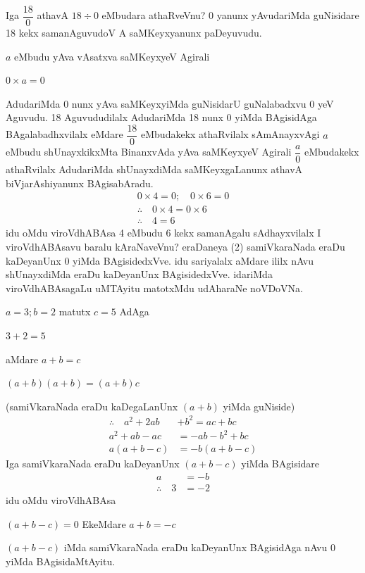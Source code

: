 Iga $\dfrac{18}{0}$ athavA $18\div 0$ eMbudara athaRveVnu? {\rm 0} yanunx yAvudariMda guNisidare {\rm 18} kekx samanAguvudoV A saMKeyxyanunx paDeyuvudu.

 $a$ eMbudu yAva vAsatxva saMKeyxyeV Agirali
\begin{center}
$0\times a=0$
\end{center}
AdudariMda {\rm 0} nunx yAva saMKeyxyiMda guNisidarU guNalabadxvu {\rm 0} yeV Aguvudu. {\rm 18} Aguvududilalx AdudariMda {\rm 18} nunx {\rm 0} yiMda BAgisidAga BAgalabadhxvilalx eMdare $\dfrac{18}{0}$ eMbudakekx athaRvilalx sAmAnayxvAgi $a$ eMbudu shUnayxkikxMta BinanxvAda yAva saMKeyxyeV Agirali $\dfrac{a}{0}$ eMbudakekx athaRvilalx AdudariMda shUnayxdiMda saMKeyxgaLanunx athavA biVjarAshiyanunx BAgisabAradu.
\begin{gather*}
0\times 4=0; \quad 0\times 6=0\tag{\rm 1}\\
\therefore \quad 0\times 4=0\times 6 \quad \tag{\rm 2}\\
\therefore \quad 4=6 \quad \tag{\rm 3}  
\end{gather*}
idu oMdu viroVdhABAsa {\rm 4} eMbudu {\rm 6} kekx samanAgalu sAdhayxvilalx I viroVdhABAsavu baralu kAraNaveVnu? eraDaneya {\rm (2)} samiVkaraNada eraDu kaDeyanUnx {\rm 0} yiMda BAgisidedxVve. idu sariyalalx aMdare ililx nAvu shUnayxdiMda eraDu kaDeyanUnx BAgisidedxVve. idariMda viroVdhABAsagaLu uMTAyitu matotxMdu udAharaNe noVDoVNa.
\begin{center}
$a=3 ; b=2$ \quad matutx \quad $c=5$ \quad AdAga

$3+2=5$

aMdare \quad $a+b=c$

$(a+b)(a+b)=(a+b)c$
\end{center}
(samiVkaraNada eraDu kaDegaLanUnx $(a+b)$ yiMda guNiside)
\begin{align*}
\therefore \quad a^2+2ab&+b^2=ac+bc\\
a^2+ab-ac&=-ab-b^2+bc\\
a(a+b-c)&=-b(a+b-c)
\end{align*}
Iga samiVkaraNada eraDu kaDeyanUnx $(a+b-c)$ yiMda BAgisidare
\begin{align*}
a&=-b\\
\therefore \quad 3&=-2
\end{align*}
idu oMdu viroVdhABAsa

$(a+b-c)=0$ \quad EkeMdare \quad $a+b=-c$

$(a+b-c)$ iMda samiVkaraNada eraDu kaDeyanUnx BAgisidAga nAvu {\rm 0} yiMda BAgisidaMtAyitu.

